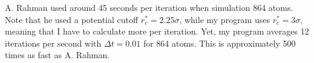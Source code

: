 \documentclass[a4paper,10pt,english]{article}
\begin{document}
A. Rahman used around 45 seconds per iteration when simulation 864 atoms. Note that he used a potential cutoff $r_c^* = 2.25 \sigma$, while my program uses $r_c^*=3 \sigma$, meaning that I have to calculate more per iteration. Yet, my program averages 12 iterations per second with $\Delta t = 0.01$ for 864 atoms. This is approximately 500 times as fast as A. Rahman. 
\end{document}
